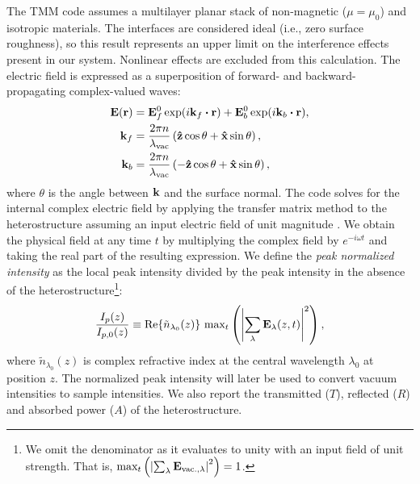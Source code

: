 The TMM code assumes a multilayer planar stack of non-magnetic ($\mu = \mu_0$) and isotropic materials. The interfaces are considered ideal (i.e., zero surface roughness), so this result represents an upper limit on the interference effects present in our system. Nonlinear effects are excluded from this calculation. The electric field is expressed as a superposition of forward- and backward-propagating complex-valued waves:
\begin{equation}
\begin{aligned}
\vb{E}(\vb{r}) &= \vb{E}_f^0 \exp(i \vb{k}_f \vdot \vb{r}) + \vb{E}_b^0 \exp(i \vb{k}_b \vdot \vb{r}), \\
\vb{k}_f &= \frac{2 \pi n}{\lambda_{\textrm{vac}}} \left( \vu{z} \cos \theta + \vu{x} \sin \theta \right), \\
\vb{k}_b &= \frac{2 \pi n}{\lambda_{\textrm{vac}}} \left( - \vu{z} \cos \theta + \vu{x} \sin \theta \right),
\end{aligned}
\end{equation}
where $\theta$ is the angle between $\vb{k}$ and the surface normal. The code solves for the internal complex electric field by applying the transfer matrix method to the heterostructure assuming an input electric field of unit magnitude \cite{nistadCausalityElectromagneticProperties2008,harbeckeCoherentIncoherentReflection1986,ohtaMatrixFormalismCalculation1990,katsidisGeneralTransfermatrixMethod2002,shalabneyElectromagneticFieldsDistribution2010}. We obtain the physical field at any time $t$ by multiplying the complex field by $e^{-i \omega t}$ and taking the real part of the resulting expression. We define the \textit{peak normalized intensity} as the local peak intensity divided by the peak intensity in the absence of the heterostructure\footnote{We omit the denominator as it evaluates to unity with an input field of unit strength. That is, $\textrm{max}_{t}\left( \left|\sum_{\lambda}\vb{E}_{\textrm{vac.},\lambda}\right|^2 \right) = 1$.}:
\begin{equation}
\frac{I_p(z)}{I_{p,0}(z)} \equiv \Re{\tilde{n}_{\lambda_0}(z)} \ \textrm{max}_{t}\left(\left|\sum_{\lambda}\vb{E}_\lambda(z, t)\right|^2 \right),
\end{equation}
where $\tilde{n}_{\lambda_0}(z)$ is complex refractive index at the central wavelength $\lambda_0$ at position $z$. The normalized peak intensity will later be used to convert vacuum intensities to sample intensities. We also report the transmitted ($T$), reflected ($R$) and absorbed power ($A$) of the heterostructure.

